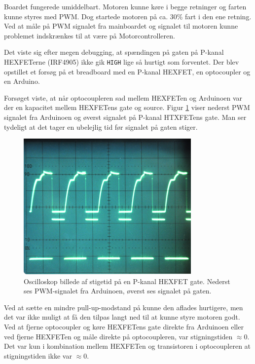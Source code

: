 \documentclass[a4paper,oneside,article,danish,table]{memoir}
\begin{document}

Boardet fungerede umiddelbart. Motoren kunne køre i begge retninger og farten kunne styres med PWM. Dog startede motoren på ca. 30\% fart i den ene retning. Ved at måle på PWM signalet fra mainboardet og signalet til motoren kunne problemet indskrænkes til at være på Motorcontrolleren.

Det viste sig efter megen debugging, at spændingen på gaten på P-kanal HEXFETerne (IRF4905) ikke gik \texttt{HIGH} lige så hurtigt som forventet. Der blev opstillet et forsøg på et breadboard med en P-kanal HEXFET, en optocoupler og en Arduino.


Forsøget viste, at når optocoupleren sad mellem HEXFETen og Arduinoen var der en kapacitet mellem HEXFETens gate og source. Figur \ref{fig:stigetid} viser nederst PWM signalet fra Arduinoen og øverst signalet på P-kanal HTXFETens gate. Man ser tydeligt at det tager en ubelejlig tid før signalet på gaten stiger.
\begin{figure}[htbp]
  \centering
  \includegraphics[width=0.8\textwidth]{pictures/stigetid.jpg}
  \caption[Oscilloskop billede af stigetid på en P-kanal HEXFET gate]{Oscilloskop billede af stigetid på en P-kanal HEXFET gate. Nederst ses PWM-signalet fra Arduinoen, øverst ses signalet på gaten.}
  \label{fig:stigetid}
\end{figure}

Ved at sætte en mindre pull-up-modstand på kunne den aflades hurtigere, men det var ikke muligt at få den tilpas langt ned til at kunne styre motoren godt. Ved at fjerne optocoupler og køre HEXFETens gate direkte fra Arduinoen eller ved fjerne HEXFETen og måle direkte på optocoupleren, var stigningstiden $\approx0$. Det var kun i kombination mellem HEXFETen og transistoren i optocoupleren at stigningstiden ikke var $\approx0$.
\end{document}
